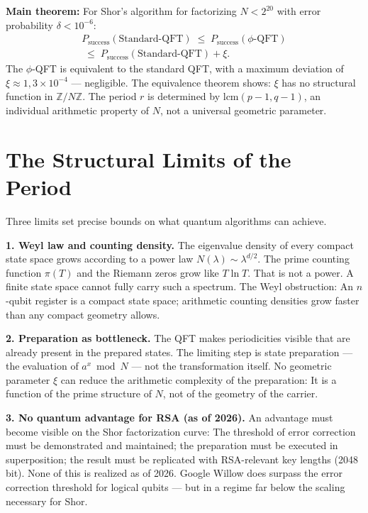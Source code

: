 \textbf{Main theorem:} For Shor's algorithm for factorizing
$N < 2^{20}$ with error probability $\delta < 10^{-6}$:
\begin{multline}
  P_{\mathrm{success}}(\text{Standard-QFT})
  \;\le\; P_{\mathrm{success}}(\phi\text{-QFT})\\
  \;\le\; P_{\mathrm{success}}(\text{Standard-QFT})+\xi.
\end{multline}
The $\phi$-QFT is equivalent to the standard QFT, with a maximum
deviation of $\xi\approx1{,}3\times10^{-4}$ --- negligible.
The equivalence theorem shows: $\xi$ has no structural function in $\mathbb{Z}/N\mathbb{Z}$. The period $r$ is determined by $\mathrm{lcm}(p-1,q-1)$,
an individual arithmetic property of $N$, not a
universal geometric parameter.

\section{The Structural Limits of the Period}

Three limits set precise bounds on what quantum algorithms can achieve.

\textbf{1. Weyl law and counting density.} The eigenvalue density
of every compact state space grows according to a power law
$N(\lambda)\sim\lambda^{d/2}$. The prime counting function $\pi(T)$ and the
Riemann zeros grow like $T\ln T$. That is not a
power. A finite state space cannot fully carry such a spectrum. The Weyl
obstruction: An $n$-qubit register is a compact state space; arithmetic counting densities grow faster than any compact geometry allows.

\textbf{2. Preparation as bottleneck.} The QFT makes
periodicities visible that are already present in the prepared states. The limiting step is state preparation
--- the evaluation of $a^x\bmod N$ --- not the transformation itself.
No geometric parameter $\xi$ can reduce the arithmetic complexity
of the preparation: It is a function of the prime structure of
$N$, not of the geometry of the carrier.

\textbf{3. No quantum advantage for RSA (as of 2026).} An
advantage must become visible on the Shor factorization curve: The threshold of error correction must be demonstrated and maintained;
the preparation must be executed in superposition; the result
must be replicated with RSA-relevant key lengths (2048 bit).
None of this is realized as of 2026. Google Willow does surpass the error correction threshold for logical qubits --- but in
a regime far below the scaling necessary for Shor.

